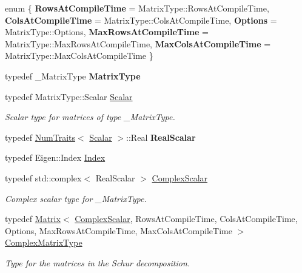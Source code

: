 \begin{DoxyCompactItemize}
\item 
\mbox{\label{class_eigen_1_1_complex_schur_a23b850c6761ce4f97cfe3631c4aa09f4}} 
enum \{ \newline
{\bfseries Rows\+At\+Compile\+Time} = Matrix\+Type\+::Rows\+At\+Compile\+Time, 
{\bfseries Cols\+At\+Compile\+Time} = Matrix\+Type\+::Cols\+At\+Compile\+Time, 
{\bfseries Options} = Matrix\+Type\+::Options, 
{\bfseries Max\+Rows\+At\+Compile\+Time} = Matrix\+Type\+::Max\+Rows\+At\+Compile\+Time, 
\newline
{\bfseries Max\+Cols\+At\+Compile\+Time} = Matrix\+Type\+::Max\+Cols\+At\+Compile\+Time
 \}
\item 
\mbox{\label{class_eigen_1_1_complex_schur_afb9e799fdea51d173e310c82d80d5947}} 
typedef \+\_\+\+Matrix\+Type {\bfseries Matrix\+Type}
\item 
\mbox{\label{class_eigen_1_1_complex_schur_a9a8ee9df37ee1f90d0e53103c58683c0}} 
typedef Matrix\+Type\+::\+Scalar \mbox{\hyperlink{class_eigen_1_1_complex_schur_a9a8ee9df37ee1f90d0e53103c58683c0}{Scalar}}
\begin{DoxyCompactList}\small\item\em Scalar type for matrices of type {\ttfamily \+\_\+\+Matrix\+Type}. \end{DoxyCompactList}\item 
\mbox{\label{class_eigen_1_1_complex_schur_a360081b7ad59db28b9955dea3e4b7dd7}} 
typedef \mbox{\hyperlink{struct_eigen_1_1_num_traits}{Num\+Traits}}$<$ \mbox{\hyperlink{class_eigen_1_1_complex_schur_a9a8ee9df37ee1f90d0e53103c58683c0}{Scalar}} $>$\+::Real {\bfseries Real\+Scalar}
\item 
typedef Eigen\+::\+Index \mbox{\hyperlink{class_eigen_1_1_complex_schur_a652104d13723a5b1db2937866a034557}{Index}}
\item 
typedef std\+::complex$<$ Real\+Scalar $>$ \mbox{\hyperlink{class_eigen_1_1_complex_schur_ae1a4713b53f821867fbad617e426832a}{Complex\+Scalar}}
\begin{DoxyCompactList}\small\item\em Complex scalar type for {\ttfamily \+\_\+\+Matrix\+Type}. \end{DoxyCompactList}\item 
typedef \mbox{\hyperlink{class_eigen_1_1_matrix}{Matrix}}$<$ \mbox{\hyperlink{class_eigen_1_1_complex_schur_ae1a4713b53f821867fbad617e426832a}{Complex\+Scalar}}, Rows\+At\+Compile\+Time, Cols\+At\+Compile\+Time, Options, Max\+Rows\+At\+Compile\+Time, Max\+Cols\+At\+Compile\+Time $>$ \mbox{\hyperlink{class_eigen_1_1_complex_schur_af61fe57877d51cfb50178f78534042f0}{Complex\+Matrix\+Type}}
\begin{DoxyCompactList}\small\item\em Type for the matrices in the Schur decomposition. \end{DoxyCompactList}\end{DoxyCompactItemize}
